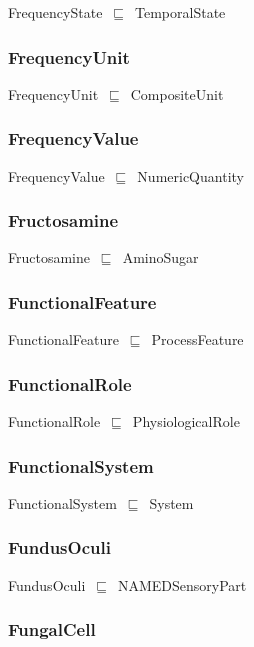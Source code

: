 \documentclass{article}
\begin{document}
FrequencyState~\ensuremath{\sqsubseteq}~TemporalState~

\subsubsection*{FrequencyUnit}

FrequencyUnit~\ensuremath{\sqsubseteq}~CompositeUnit~

\subsubsection*{FrequencyValue}

FrequencyValue~\ensuremath{\sqsubseteq}~NumericQuantity~

\subsubsection*{Fructosamine}

Fructosamine~\ensuremath{\sqsubseteq}~AminoSugar~

\subsubsection*{FunctionalFeature}

FunctionalFeature~\ensuremath{\sqsubseteq}~ProcessFeature~

\subsubsection*{FunctionalRole}

FunctionalRole~\ensuremath{\sqsubseteq}~PhysiologicalRole~

\subsubsection*{FunctionalSystem}

FunctionalSystem~\ensuremath{\sqsubseteq}~System~

\subsubsection*{FundusOculi}

FundusOculi~\ensuremath{\sqsubseteq}~NAMEDSensoryPart~

\subsubsection*{FungalCell}
\end{document}
